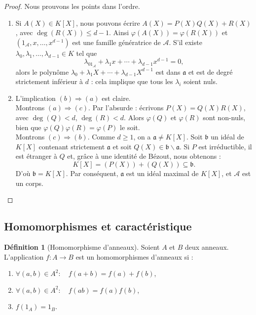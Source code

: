 \documentclass[a4paper, titlepage]{article}
\theoremstyle{definition}
\newtheorem{defi}[theo]{Définition}
\theoremstyle{remark}
\begin{document}
\begin{proof} Nous prouvons les points dans l'ordre.
\begin{enumerate}
\item Si $A(X) \in K[X]$, nous pouvons écrire $A(X) = P(X)Q(X)+R(X)$, avec $\deg(R(X)) \leqslant d-1$. Ainsi $\varphi(A(X)) = \varphi(R(X))$ et $(1_\mathcal{A}, x, \dots, x^{d-1})$ est une famille génératrice de $\mathcal{A}$.
S'il existe $\lambda_0, \lambda_1, \dots, \lambda_{d-1} \in K$ tel que 
$$\lambda_01_\mathcal{A} + \lambda_1x + \cdots + \lambda_{d-1}x^{d-1} = 0,$$
alors le polynôme $\lambda_0 + \lambda_1X + \cdots + \lambda_{d-1}X^{d-1}$ est dans $\mathfrak{a}$ et est de degré strictement inférieur à $d$ : cela implique que tous les $\lambda_i$ soient nuls.
\item L'implication $(b) \Rightarrow (a)$ est claire.\\ Montrons $(a) \Rightarrow (c)$. Par l'absurde : écrivons $P(X) = Q(X)R(X)$, avec $\deg(Q) < d$, $\deg(R) < d$. Alors $\varphi(Q)$ et $\varphi(R)$ sont non-nuls, bien que $\varphi(Q)\varphi(R) = \varphi(P)$ le soit.\\
Montrons $(c) \Rightarrow (b)$. Comme $d \geqslant 1$, on a $\mathfrak{a} \neq K[X]$. Soit $\mathfrak{b}$ un idéal de $K[X]$ contenant strictement $\mathfrak{a}$ et soit $Q(X) \in \mathfrak{b} \backslash \mathfrak{a}$. Si $P$ est irréductible, il est étranger à $Q$ et, grâce à une identité de Bézout, nous obtenons : 
$$K[X] = (P(X)) + (Q(X)) \subseteq \mathfrak{b}.$$
D'où $\mathfrak{b} = K[X]$. Par conséquent, $\mathfrak{a}$ est un idéal maximal de $K[X]$, et $\mathcal{A}$ est un corps.
\end{enumerate}
\end{proof}

\subsection{Homomorphismes et caractéristique}

\begin{defi}[Homomorphisme d'anneaux]\label{defMorphismeAnneaux}
Soient $A$ et $B$ deux anneaux. L'application $f: A \rightarrow B$ est un homomorphismes d'anneaux si : \begin{enumerate}
\item $\forall (a,b) \in A^2: \quad f(a+b) = f(a) + f(b)$,
\item $\forall (a,b) \in A^2: \quad f(ab) = f(a)f(b)$,
\item $f(1_A) = 1_B$.
\end{enumerate}
\end{defi}
\end{document}
